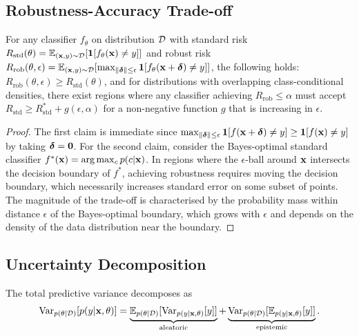 \subsection{Robustness-Accuracy Trade-off}
\label{app:robustness_tradeoff}

\begin{proposition}
\label{prop:ra_tradeoff}
For any classifier $f_\theta$ on distribution $\mathcal{D}$ with standard risk $R_{\mathrm{std}}(\theta) = \mathbb{E}_{(\mathbf{x},y)\sim\mathcal{D}}[\mathbf{1}[f_\theta(\mathbf{x})\neq y]]$ and robust risk $R_{\mathrm{rob}}(\theta,\epsilon) = \mathbb{E}_{(\mathbf{x},y)\sim\mathcal{D}}[\max_{\|\boldsymbol{\delta}\|\le\epsilon}\mathbf{1}[f_\theta(\mathbf{x}+\boldsymbol{\delta})\neq y]]$, the following holds: $R_{\mathrm{rob}}(\theta,\epsilon)\ge R_{\mathrm{std}}(\theta)$, and for distributions with overlapping class-conditional densities, there exist regions where any classifier achieving $R_{\mathrm{rob}}\le\alpha$ must accept $R_{\mathrm{std}}\ge R_{\mathrm{std}}^* + g(\epsilon,\alpha)$ for a non-negative function $g$ that is increasing in $\epsilon$.
\end{proposition}

\begin{proof}
The first claim is immediate since $\max_{\|\boldsymbol{\delta}\|\le\epsilon}\mathbf{1}[f(\mathbf{x}+\boldsymbol{\delta})\neq y]\ge\mathbf{1}[f(\mathbf{x})\neq y]$ by taking $\boldsymbol{\delta}=\mathbf{0}$. For the second claim, consider the Bayes-optimal standard classifier $f^*(\mathbf{x}) = \arg\max_c p(c|\mathbf{x})$. In regions where the $\epsilon$-ball around $\mathbf{x}$ intersects the decision boundary of $f^*$, achieving robustness requires moving the decision boundary, which necessarily increases standard error on some subset of points. The magnitude of the trade-off is characterised by the probability mass within distance $\epsilon$ of the Bayes-optimal boundary, which grows with $\epsilon$ and depends on the density of the data distribution near the boundary.
\end{proof}


\subsection{Uncertainty Decomposition}
\label{app:uncertainty_decomp}

\begin{proposition}
\label{prop:uncertainty}
The total predictive variance decomposes as
\begin{equation}
\mathrm{Var}_{p(\theta|\mathcal{D})}[p(y|\mathbf{x},\theta)]
= \underbrace{\mathbb{E}_{p(\theta|\mathcal{D})}[\mathrm{Var}_{p(y|\mathbf{x},\theta)}[y]]}_{\text{aleatoric}}
+ \underbrace{\mathrm{Var}_{p(\theta|\mathcal{D})}[\mathbb{E}_{p(y|\mathbf{x},\theta)}[y]]}_{\text{epistemic}}.
\end{equation}
\end{proposition}

